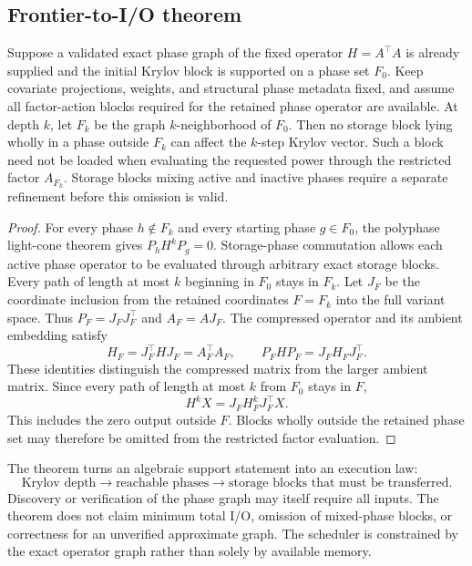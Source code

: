 \subsection{Frontier-to-I/O theorem}

\begin{theorem}\label{claim:final-29-3}
Suppose a validated exact phase graph of the fixed operator $H=A^\top A$
is already supplied and the initial Krylov block is supported on a phase set
$F_0$.  Keep covariate projections, weights, and structural phase metadata
fixed, and assume all factor-action blocks required for the retained phase
operator are available.  At depth $k$, let $F_k$ be the graph
$k$-neighborhood of $F_0$.  Then no storage block lying wholly in a phase
outside $F_k$ can affect the $k$-step Krylov vector.  Such a block need not be
loaded when evaluating the requested power through the restricted factor
$A_{F_k}$.  Storage blocks mixing active and inactive phases require a
separate refinement before this omission is valid.
\end{theorem}

\begin{proof}
For every phase $h\notin F_k$ and every starting phase $g\in F_0$, the
polyphase light-cone theorem gives $P_hH^kP_g=0$.  Storage-phase commutation
allows each active phase operator to be evaluated through arbitrary exact
storage blocks.  Every path of length at most $k$ beginning in $F_0$ stays in $F_k$.
Let $J_F$ be the coordinate inclusion from the retained coordinates
$F=F_k$ into the full variant space. Thus $P_F=J_FJ_F^\top$ and
$A_F=AJ_F$. The compressed operator and its ambient embedding satisfy
\[
H_F=J_F^\top HJ_F=A_F^\top A_F,
\qquad P_FHP_F=J_FH_FJ_F^\top.
\]
These identities distinguish the compressed matrix from the larger ambient
matrix. Since every path of length at most $k$ from $F_0$ stays in $F$,
\[
H^kX=J_F H_F^k J_F^\top X.
\]
This includes the zero output outside $F$. Blocks wholly outside the retained
phase set may therefore be omitted from the restricted factor evaluation.
\end{proof}

The theorem turns an algebraic support statement into an execution law:
\[
\boxed{
\text{Krylov depth}
\longrightarrow
\text{reachable phases}
\longrightarrow
\text{storage blocks that must be transferred}.
}
\]
Discovery or verification of the phase graph may itself require all inputs.
The theorem does not claim minimum total I/O, omission of mixed-phase blocks,
or correctness for an unverified approximate graph.  The scheduler is constrained
by the exact operator graph rather than solely by available memory.

